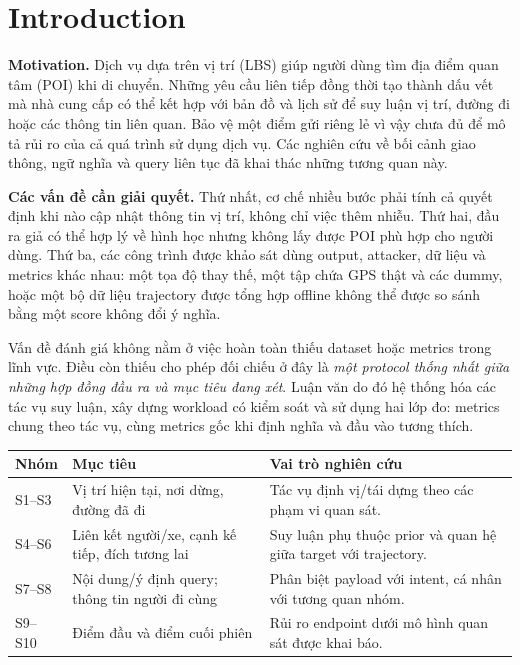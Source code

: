 \section{Introduction}
\textbf{Motivation.} Dịch vụ dựa trên vị trí (LBS) giúp người dùng tìm địa điểm quan tâm (POI) khi di chuyển.
Những yêu cầu liên tiếp đồng thời tạo thành dấu vết mà nhà cung cấp có thể kết hợp với bản đồ và lịch sử
để suy luận vị trí, đường đi hoặc các thông tin liên quan. Bảo vệ một điểm gửi riêng lẻ vì vậy chưa đủ
để mô tả rủi ro của cả quá trình sử dụng dịch vụ. Các nghiên cứu về bối cảnh giao thông, ngữ nghĩa và
query liên tục đã khai thác những tương quan này\cite{transprotect,semantic,fake}.

\textbf{Các vấn đề cần giải quyết.} Thứ nhất, cơ chế nhiều bước phải tính cả quyết định khi nào cập nhật
thông tin vị trí, không chỉ việc thêm nhiễu. Thứ hai, đầu ra giả có thể hợp lý về hình học nhưng không
lấy được POI phù hợp cho người dùng. Thứ ba, các công trình được khảo sát dùng output, attacker, dữ liệu
và metrics khác nhau: một tọa độ thay thế, một tập chứa GPS thật và các dummy, hoặc một bộ dữ liệu
trajectory được tổng hợp offline không thể được so sánh bằng một score không đổi ý nghĩa.

Vấn đề đánh giá không nằm ở việc hoàn toàn thiếu dataset hoặc metrics trong lĩnh vực. Điều còn thiếu
cho phép đối chiếu ở đây là \emph{một protocol thống nhất giữa những hợp đồng đầu ra và mục tiêu đang xét}.
Luận văn do đó hệ thống hóa các tác vụ suy luận, xây dựng workload có kiểm soát và sử dụng hai lớp đo:
metrics chung theo tác vụ, cùng metrics gốc khi định nghĩa và đầu vào tương thích.

\begin{tabularx}{\linewidth}{@{}P{2.1cm}P{5.6cm}Y@{}}\toprule
\textbf{Nhóm} & \textbf{Mục tiêu} & \textbf{Vai trò nghiên cứu}\\\midrule
S1--S3 & Vị trí hiện tại, nơi dừng, đường đã đi & Tác vụ định vị/tái dựng theo các phạm vi quan sát.\\
S4--S6 & Liên kết người/xe, cạnh kế tiếp, đích tương lai & Suy luận phụ thuộc prior và quan hệ giữa target với trajectory.\\
S7--S8 & Nội dung/ý định query; thông tin người đi cùng & Phân biệt payload với intent, cá nhân với tương quan nhóm.\\
S9--S10 & Điểm đầu và điểm cuối phiên & Rủi ro endpoint dưới mô hình quan sát được khai báo.\\\bottomrule
\end{tabularx}

